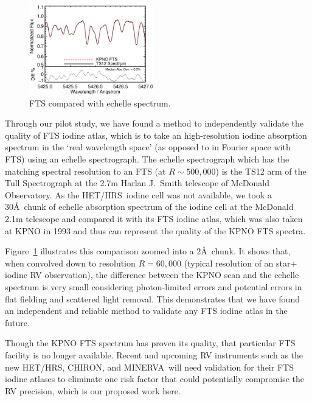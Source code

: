 \documentclass[12pt]{article}
\def\minerva{MINERVA}
\def\hrs{HET/HRS}
\begin{document}
\begin{figure}
  \vspace{-35pt}
  \begin{center}
    \includegraphics[width=0.48\textwidth]{fts}
  \end{center}
  \vspace{-25pt}  
  \caption{FTS compared with echelle spectrum.}
  \vspace{-8pt}  
  \label{fig:fts}
\end{figure}

Through our pilot study, we have found a method to independently
validate the quality of FTS iodine atlas, which is to take an
high-resolution iodine absorption spectrum in the `real wavelength
space' (as opposed to in Fourier space with FTS) using an echelle
spectrograph. The echelle spectrograph which has
the matching spectral resolution to an FTS (at $R \sim 500,000$) is
the TS12 arm of the Tull Spectrograph at the 2.7m Harlan J.~Smith
telescope of McDonald Observatory. As the \hrs\ iodine cell was not
available, we took a 30\AA\ chunk of echelle absorption spectrum of
the iodine cell at the McDonald 2.1m telescope and compared it with
its FTS iodine atlas, which was also taken at KPNO in 1993 and thus
can represent the quality of the KPNO FTS spectra. 

Figure~\ref{fig:fts} illustrates this comparison zoomed into a 2\AA\
chunk.  It shows that, when convolved down to resolution $R=60,000$
(typical resolution of an star$+$iodine RV observation), the
difference between the KPNO scan and the echelle spectrum is very
small considering photon-limited errors and potential errors in flat
fielding and scattered light removal. This demonstrates that we have
found an independent and reliable method to validate any FTS iodine
atlas in the future.

Though the KPNO FTS spectrum has proven its quality, that particular
FTS facility is no longer available. Recent and upcoming RV
instruments such as the new \hrs, CHIRON, and \minerva\ will need
validation for their FTS iodine atlases to eliminate one risk factor
that could potentially compromise the RV precision, which is our
proposed work here.
\end{document}
